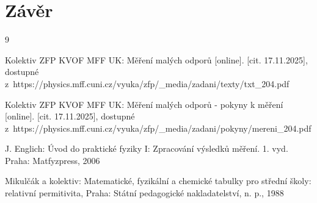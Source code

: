 \documentclass{../concepts/prepareprotokol} %
\begin{document}
\section{Závěr}


\begin{thebibliography}{9}

 Kolektiv ZFP KVOF MFF UK: Měření malých odporů [online]. [cit. 17.11.2025], dostupné z~https://physics.mff.cuni.cz/vyuka/zfp/\_media/zadani/texty/txt\_204.pdf

 Kolektiv ZFP KVOF MFF UK: Měření malých odporů - pokyny k měření [online]. [cit. 17.11.2025], dostupné
z~https://physics.mff.cuni.cz/vyuka/zfp/\_media/zadani/pokyny/mereni\_204.pdf

 J. Englich: Úvod do praktické fyziky I: Zpracování výsledků měření. 1. vyd. Praha: Matfyzpress, 2006

 Mikulčák a kolektiv: Matematické, fyzikální a chemické tabulky pro střední školy: relativní permitivita, Praha: Státní pedagogické nakladatelství, n. p., 1988

\end{thebibliography}
\end{document}
